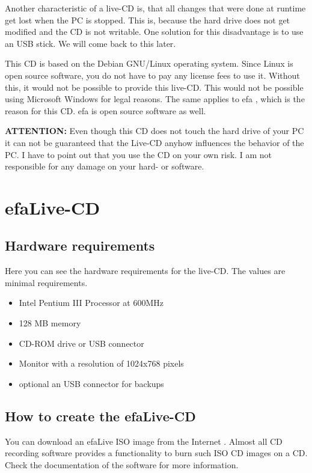 \documentclass[a4paper,12pt,twoside]{article}
\begin{document}
Another characteristic of a live-CD is, that all changes that were done
at runtime get lost when the PC is stopped. This is, because the hard
drive does not get modified and the CD is not writable. One solution
for this disadvantage is to use an USB stick. We will come back to this
later.

This CD is based on the Debian GNU/Linux \cite{DEB1} operating system.
Since Linux is open source software, you do not have to pay any license
fees to use it. Without this, it would not be possible to provide this
live-CD. This would not be possible using Microsoft Windows for legal
reasons. The same applies to efa \cite{EFA1}, which is the reason for
this CD. efa is open source software as well.

\bigskip
\textbf{ATTENTION:} Even though this CD does not touch the hard drive of your PC
it can not be guaranteed that the Live-CD anyhow influences the
behavior of the PC. I have to point out that you use the CD on your own
risk. I am not responsible for any damage on your hard- or software.
\bigskip

\section{efaLive-CD}
\label{sct:efalivecd}
\subsection{Hardware requirements}
\label{sct:live_hardware}
Here you can see the hardware requirements for the live-CD. The values
are minimal requirements.

\begin{itemize}
    \item Intel Pentium III Processor at 600MHz
    \item 128 MB memory
    \item CD-ROM drive or USB connector
    \item Monitor with a resolution of 1024x768 pixels
    \item optional an USB connector for backups
\end{itemize}

\subsection{How to create the efaLive-CD}
\label{sct:create_cd}
You can download an efaLive ISO image from the Internet \cite{EFA4}.
Almost all CD recording software provides a functionality to burn such
ISO CD images on a CD. Check the documentation of the software for more
information.
\end{document}
